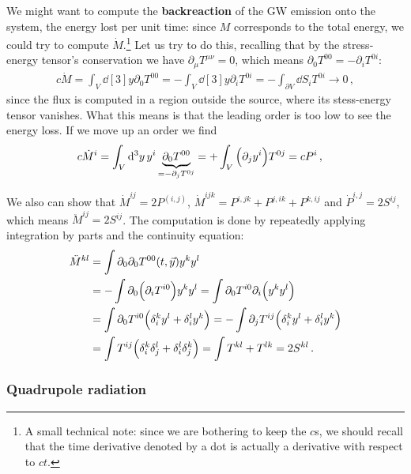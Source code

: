 \documentclass[main.tex]{subfiles}
\begin{document}
We might want to compute the \textbf{backreaction} of the GW emission onto the system, the energy lost per unit time: since \(M\) corresponds to the total energy, we could try to compute \(\dot{M}\).\footnote{A small technical note: since we are bothering to keep the \(c\)s, we should recall that the time derivative denoted by a dot is actually a derivative with respect to \(ct\).}
Let us try to do this, recalling that by the stress-energy tensor's conservation we have \(\partial_{\mu } T^{\mu \nu } = 0\), which means \(\partial_{0} T^{00} = - \partial_{i} T^{0i}\): 
%
\begin{align}
c\dot{M} = \int_{V} \dd[3]{y} \partial_{0} T^{00}
= - \int_{V} \dd[3]{y} \partial_{i} T^{0i}
= - \int_{\partial V} \dd{S}_i T^{0i} \to 0
\,,
\end{align}
%
since the flux is computed in a region outside the source, where its stess-energy tensor vanishes. 
What this means is that the leading order is too low to see the energy loss. 
If we move up an order we find 
%
\begin{align}
c \dot{M}^{i} &= \int_{V} \dd[3]{y} y^{i} \underbrace{\partial_{0} T^{00}}_{= - \partial_{j} T^{0j}}
= + \int_{V} \qty(\partial_{j} y^{i}) T^{0j} = cP^{i}
\,,
\end{align}
%

We also can show that \(\dot{M}^{ij} = 2 P^{(i, j)}\), \(\dot{M}^{ijk} = P^{i,jk} + P^{j, ik} + P^{k, ij}\) and \(\dot{P}^{i,j} = 2 S^{ij}\), which means \(\ddot{M}^{ij} = 2 S^{ij}\).
The computation is done by repeatedly applying integration by parts and the continuity equation: 
%
\begin{align}
\ddot{M}^{kl} &= \int \partial_0 \partial_0 T^{00}(t, \vec{y}) y^{k}y^{l}  \\
&= - \int \partial_0 \qty(\partial_{i} T^{i0}) y^{k}y^{l}  
= \int \partial_0 T^{i0} \partial_{i} \qty(y^{k}y^{l})  \\
&= \int \partial_0 T^{i0} \qty(\delta_i^k y^{l} + \delta_{i}^{l} y^{k})  
= -\int \partial_{j} T^{ij} \qty(\delta_i^k y^{l} + \delta_{i}^{l} y^{k})  \\
&= \int T^{ij} \qty(\delta_{i}^{k} \delta^{l}_{j} + \delta_{i}^{l} \delta^{k}_{j})
= \int T^{kl} + T^{lk} = 2 S^{kl}
\,.
\end{align}

\subsubsection{Quadrupole radiation}
\end{document}
